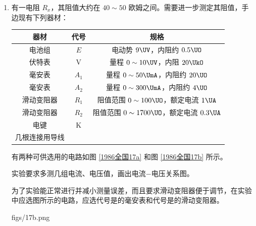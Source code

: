 \documentclass[\gkver]{gaokaozhenti}
\begin{document}
\begin{enumerate}
{图像法：从图像可以看出，加速度不同，时间不同，位移也不同，但末速度相同，都是 $v=2v_{0}$。

}

\item
有一电阻 $R_{x}$，其阻值大约在 $40\sim50$ 欧姆之间。需要进一步测定其阻值，手边现有下列器材：

\begin{center}
\begin{tabular}{|c|c|c|}
\hline
器材 & 代号 & 规格 \\
\hline
电池组 & $E$ & 电动势 $9\UV$，内阻约 $0.5\UO$ \\
\hline
伏特表 & V & 量程 $0\sim10\UV$，内阻 $20\UkO$ \\
\hline
毫安表 & $A_{1}$ & 量程 $0\sim50\UmA$，内阻约 $20\UO$ \\
\hline
毫安表 & $A_{2}$ & 量程 $0\sim300\UmA$，内阻约 $4\UO$ \\
\hline
滑动变阻器 & $R_{1}$ & 阻值范围 $0\sim100\UO$，额定电流 $1\UA$ \\
\hline
滑动变阻器 & $R_{2}$ & 阻值范围 $0\sim1700\UO$，额定电流 $0.3\UA$ \\
\hline
电键 & K & \\
\hline
几根连接用导线 & & \\
\hline
\end{tabular}
\end{center}

有两种可供选用的电路如图 \ref{1986全国17a} 和图 \ref{1986全国17b} 所示。

实验要求多测几组电流、电压值，画出电流$-$电压关系图。

为了实验能正常进行并减小测量误差，而且要求滑动变阻器便于调节，在实验中应选图所示的电路，应选代号是的毫安表和代号是的滑动变阻器。

{figs/17b.png}


\end{enumerate}
\end{document}
